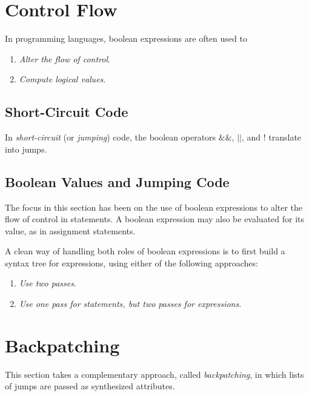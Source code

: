 \documentclass[12pt,a4paper,twoside,openany]{book}
\begin{document}
\section{Control Flow}

In programming languages, boolean expressions are often used to
\begin{enumerate}
    \item \textit{Alter the flow of control}.
    \item \textit{Compute logical values}.
\end{enumerate}

\subsection{Short-Circuit Code}

In \textit{short-circuit} (or \textit{jumping}) code, the boolean operators $\&\&$, $||$, and $!$ translate into jumps.

\subsection{Boolean Values and Jumping Code}

The focus in this section has been on the use of boolean expressions to alter the flow of control in statements. A boolean expression may also be evaluated for its value, as in assignment statements.

A clean way of handling both roles of boolean expressions is to first build a syntax tree for expressions, using either of the following approaches:
\begin{enumerate}
    \item \textit{Use two passes}.
    \item \textit{Use one pass for statements, but two passes for expressions}.
\end{enumerate}

\section{Backpatching}

This section takes a complementary approach, called \textit{backpatching}, in which lists of jumps are passed as synthesized attributes.

\end{document}
